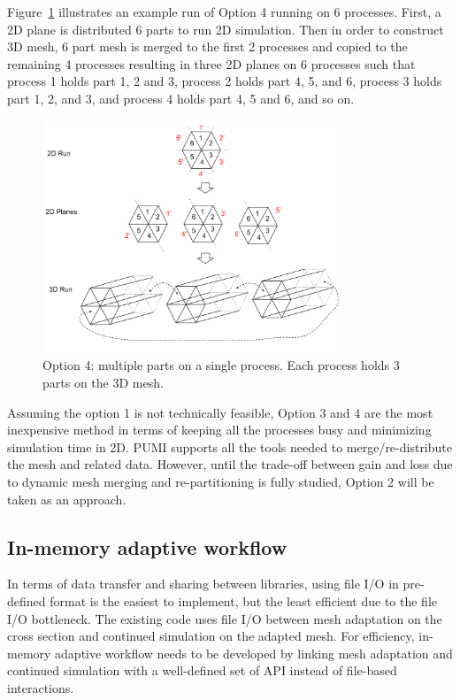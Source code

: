 \documentclass[11pt]{article}  %
\begin{document}
Figure~\ref{fig:wedgePlane2} illustrates an example run of Option 4 running on 6 processes. First, a 2D plane is distributed 6 parts to run 2D simulation. Then in order to construct 3D mesh, 6 part mesh is merged to the first 2 processes and copied to the remaining 4 processes resulting in three 2D planes on 6 processes such that process 1 holds part 1, 2 and 3, process 2 holds part 4, 5, and 6, process 3 holds part 1, 2, and 3, and process 4 holds part 4, 5 and 6, and so on.

\begin{figure}
\center
\includegraphics[width=0.8\textwidth]{fig/wedgePlane2.png}
\caption{\small{Option 4: multiple parts on a single process. Each process holds 3 parts on the 3D mesh.}} 
\label{fig:wedgePlane2}
\end{figure}

Assuming the option 1 is not technically feasible, Option 3 and 4 are the most inexpensive method in terms of keeping all the processes busy and minimizing simulation time in 2D. PUMI supports all the tools needed to merge/re-distribute the mesh and related data. However, until the trade-off between gain and loss due to dynamic mesh merging and re-partitioning is fully studied, Option 2 will be taken as an approach.  

\subsection{In-memory adaptive workflow}

In terms of data transfer and sharing between libraries, using file I/O in pre-defined format is the easiest to implement, but the least efficient due to the file I/O bottleneck. The existing code uses file I/O between mesh adaptation on the cross section and continued simulation on the adapted mesh. 
For efficiency, in-memory adaptive workflow needs to be developed by linking mesh adaptation and continued simulation with a well-defined set of API instead of file-based interactions.
\end{document}
